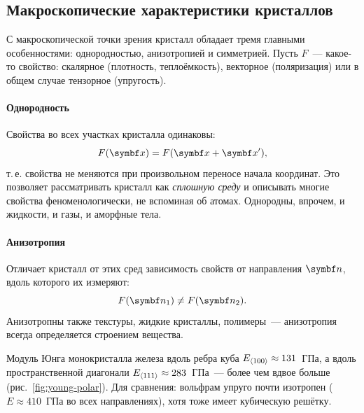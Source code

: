 \subsection{Макроскопические характеристики кристаллов}\label{ssec:macro}

С макроскопической точки зрения кристалл обладает тремя главными
особенностями: однородностью, анизотропией и симметрией. Пусть $F$~—
какое-то свойство: скалярное (плотность, теплоёмкость), векторное
(поляризация) или в общем случае тензорное (упругость).

\paragraph{Однородность}
Свойства во всех участках кристалла одинаковы:
\begin{equation}\label{eq:homog}
F(\vb x)=F(\vb x+\vb x') ,
\end{equation}
т.\,е. свойства не меняются при произвольном переносе начала координат.
Это позволяет рассматривать кристалл как \emph{сплошную среду} и описывать
многие свойства феноменологически, не вспоминая об атомах. Однородны,
впрочем, и жидкости, и газы, и аморфные тела.

\paragraph{Анизотропия}
Отличает кристалл от этих сред зависимость свойств от направления $\vb n$,
вдоль которого их измеряют:
\begin{equation}\label{eq:anis}
F(\vb n_1)\ne F(\vb n_2) .
\end{equation}
Анизотропны также текстуры, жидкие кристаллы, полимеры~— анизотропия
всегда определяется строением вещества.

\begin{primer}
Модуль Юнга монокристалла железа вдоль ребра куба
$E_{\langle 100\rangle}\approx131$~ГПа, а вдоль пространственной диагонали
$E_{\langle 111\rangle}\approx283$~ГПа~— более чем вдвое больше
(рис.~\ref{fig:young-polar}). Для сравнения: вольфрам упруго почти
изотропен ($E\approx410$~ГПа во всех направлениях), хотя тоже имеет
кубическую решётку.
\end{primer}

